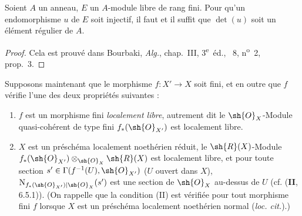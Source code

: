 \begin{lemma}[21.5.2]
\label{IV.21.5.2}
Soient $A$ un anneau, $E$ un $A$-module libre de rang fini.
Pour qu'un endomorphisme $u$ de $E$ soit injectif, il faut et il suffit que $\det(u)$ soit un élément régulier de $A$.
\end{lemma}

\begin{proof}
Cela est prouvé dans Bourbaki, \emph{Alg.}, chap.~III, 3\textsuperscript{e}~éd., \textsection~8, n\textsuperscript{o}~2, prop.~3.
\end{proof}

\begin{env}[21.5.3]
\label{IV.21.5.3}
Supposons maintenant que le morphisme $f:X'\to X$ soit fini, et en outre que $f$ vérifie l'une des deux propriétés suivantes :
\begin{enumerate}[label=\Roman*)]
  \item $f$ est un morphisme fini \emph{localement libre}, autrement dit  le $\sh{O}_X$-Module quasi-cohérent de type fini $f_*(\sh{O}_{X'})$ est localement libre.
  \item $X$ est un préschéma localement noethérien réduit, le $\sh{R}(X)$-Module $f_*(\sh{O}_{X'})\otimes_{\sh{O}_X}\sh{R}(X)$ est localement libre, et pour toute section $s'\in\Gamma(f^{-1}(U),\sh{O}_{X'})$ ($U$ ouvert
  dans $X$), $\mathrm{N}_{f_*(\sh{O}_{X'})|\sh{O}_X}(s')$ est une section de $\sh{O}_X$ au-dessus de $U$ (cf. (\textbf{II}, 6.5.1)).
  (On rappelle que la condition (II) est vérifiée pour tout morphisme fini $f$ lorsque $X$ est un préschéma localement noethérien normal (\emph{loc. cit.}).)
\end{enumerate}


\end{env}
